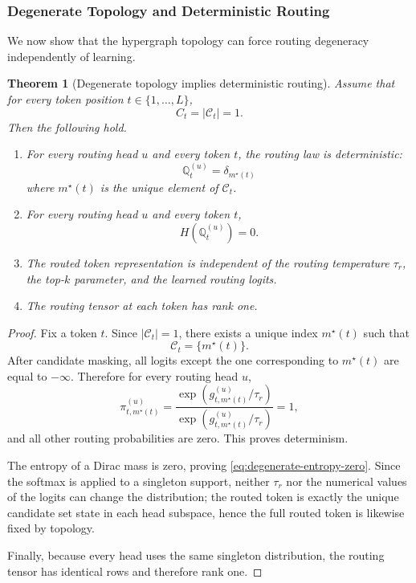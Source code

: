 \documentclass{article}
\theoremstyle{plain}
\newtheorem{theorem}{Theorem}[section]
\theoremstyle{definition}
\theoremstyle{remark}
\begin{document}
\subsubsection{Degenerate Topology and Deterministic Routing}
\label{sec:tier-a-degenerate-topology}

We now show that the hypergraph topology can force routing degeneracy independently of learning.

\begin{theorem}[Degenerate topology implies deterministic routing]
\label{thm:degenerate-topology}
Assume that for every token position $t \in \{1,\dots,L\}$,
\begin{equation}
\label{eq:degenerate-candidate-condition}
C_{t}=|\mathcal{C}_{t}|=1.
\end{equation}
Then the following hold.

\begin{enumerate}
    \item For every routing head $u$ and every token $t$, the routing law is deterministic:
    \[
    \mathbb{Q}^{(u)}_{t} = \delta_{m^\star(t)}
    \]
    where $m^\star(t)$ is the unique element of $\mathcal{C}_{t}$.

    \item For every routing head $u$ and every token $t$,
    \begin{equation}
    \label{eq:degenerate-entropy-zero}
    H\!\left(\mathbb{Q}^{(u)}_{t}\right)=0.
    \end{equation}

    \item The routed token representation is independent of the routing temperature $\tau_r$, the top-$k$ parameter, and the learned routing logits.

    \item The routing tensor at each token has rank one.
\end{enumerate}
\end{theorem}

\begin{proof}
Fix a token $t$. Since $|\mathcal{C}_{t}|=1$, there exists a unique index $m^\star(t)$ such that
\[
\mathcal{C}_{t}=\{m^\star(t)\}.
\]
After candidate masking, all logits except the one corresponding to $m^\star(t)$ are equal to $-\infty$. Therefore for every routing head $u$,
\[
\pi^{(u)}_{t,m^\star(t)}
=
\frac{\exp(g^{(u)}_{t,m^\star(t)}/\tau_r)}
{\exp(g^{(u)}_{t,m^\star(t)}/\tau_r)}
=
1,
\]
and all other routing probabilities are zero. This proves determinism.

The entropy of a Dirac mass is zero, proving \eqref{eq:degenerate-entropy-zero}. Since the softmax is applied to a singleton support, neither $\tau_r$ nor the numerical values of the logits can change the distribution; the routed token is exactly the unique candidate set state in each head subspace, hence the full routed token is likewise fixed by topology.

Finally, because every head uses the same singleton distribution, the routing tensor has identical rows and therefore rank one.
\end{proof}
\end{document}
